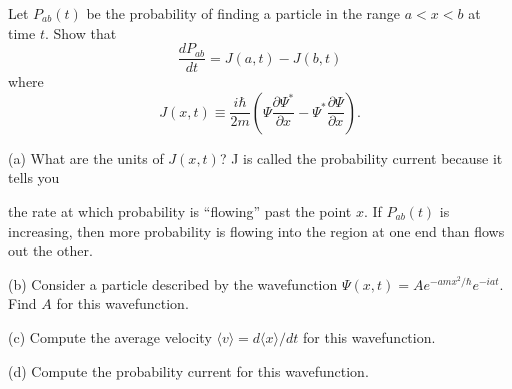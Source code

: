 \documentclass{article}
\begin{document}
\begin{ques}\label{q4}
Let $P_{ab}(t)$ be the probability of finding a particle in the range $a < x < b$ at time $t$. Show
that
\[
\frac{dP_{ab}}{dt} = J(a, t) - J(b, t)
\]
where
\[
J(x, t) \equiv \frac{i\hbar}{2m}
\left(
\Psi \frac{\partial\Psi^*}{\partial x}
- \Psi^* \frac{\partial \Psi}{\partial x}
\right).
\]

(a) What are the units of $J(x, t)$? J is called the probability current because it tells you

the rate at which probability is “flowing” past the point $x$. If $P_{ab}(t)$ is increasing,
then more probability is flowing into the region at one end than flows out the other.

(b) Consider a particle described by the wavefunction $\Psi(x, t) = A e^{-amx^2/\hbar} e^{-iat}$. Find $A$
for this wavefunction.

(c) Compute the average velocity $\langle v\rangle = d\langle x\rangle/dt$ for this wavefunction.

(d) Compute the probability current for this wavefunction.
\end{ques}
\end{document}
